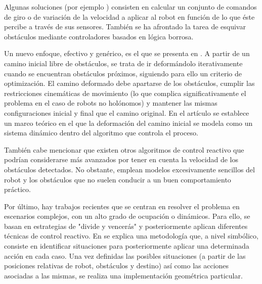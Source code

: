 Algunas soluciones (por ejemplo \cite{Feiten94}) consisten en calcular un conjunto de comandos de giro o de variación de la velocidad a aplicar al robot en función de lo que éste percibe a través de sus sensores. También se ha afrontado la tarea de esquivar obstáculos mediante controladores basados en lógica borrosa.

Un nuevo enfoque, efectivo y genérico, es el que se presenta en \cite{Lamiraux04}. A partir de un camino inicial libre de obstáculos, se trata de ir deformándolo iterativamente cuando se encuentran obstáculos próximos, siguiendo para ello un criterio de optimización. El camino deformado debe apartarse de los obstáculos, cumplir las restricciones cinemáticas de movimiento (lo que complica significativamente el problema en el caso de robots no holónomos) y mantener las mismas configuraciones inicial y final que el camino original. En el artículo se establece un marco teórico en el que la deformación del camino inicial se modela como un sistema dinámico dentro del algoritmo que controla el proceso.

También cabe mencionar que existen otros algoritmos de control reactivo que podrían considerarse más avanzados por tener en cuenta la velocidad de los obstáculos detectados. No obstante, emplean modelos excesivamente sencillos del robot y los obstáculos que no suelen conducir a un buen comportamiento práctico.

Por último, hay trabajos recientes que se centran en resolver el problema en escenarios complejos, con un alto grado de ocupación o dinámicos. Para ello, se basan en estrategias de "divide y vencerás" y posteriormente aplican diferentes técnicas de control reactivo. En \cite{Minguez04} se explica una metodología que, a nivel simbólico, consiste en identificar situaciones para posteriormente aplicar una determinada acción en cada caso. Una vez definidas las posibles situaciones (a partir de las posiciones relativas de robot, obstáculos y destino) así como las acciones asociadas a las mismas, se realiza una implementación geométrica particular.


